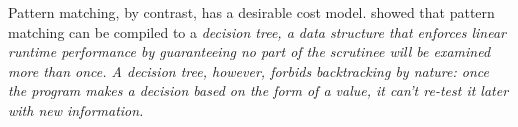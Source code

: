 \documentclass[manuscript,screen,review, 12pt, nonacm]{acmart}
\begin{document}

    Pattern matching, by contrast, has a desirable cost model. \citet{maranget}
    showed that pattern matching can be compiled to a \it{decision tree}, a data
    structure that enforces linear runtime performance by guaranteeing no part
    of the scrutinee will be examined more than once. A decision tree, however,
    forbids backtracking by nature: once the program makes a decision based on
    the form of a value, it can't re-test it later with new information. 
    
\end{document}
